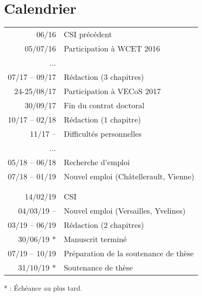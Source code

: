 \section{Calendrier}
\label{sec:timeline}

\begin{tabular}{r|l}
              06/16 \hspace{.5em} & CSI précédent
  \\       05/07/16 \hspace{.5em} & Participation à WCET 2016
  \\            ... \hspace{.5em} & 
  \\ 07/17 -- 09/17 \hspace{.5em} & Rédaction (3 chapitres)
  \\    24-25/08/17 \hspace{.5em} & Participation à VECoS 2017
  \\       30/09/17 \hspace{.5em} & Fin du contrat doctoral
  \\ 10/17 -- 02/18 \hspace{.5em} & Rédaction (1 chapitre)
  \\       11/17 -- \hspace{.5em} & Difficultés personnelles
  \\            ... \hspace{.5em} & 
  \\ 05/18 -- 06/18 \hspace{.5em} & Recherche d'emploi
  \\ 07/18 -- 01/19 \hspace{.5em} & Nouvel emploi (Châtellerault, Vienne)
  \\                              & 
  \\ \hline
  \\       14/02/19 \hspace{.5em} & CSI
  \\    04/03/19 -- \hspace{.5em} & Nouvel emploi (Versailles, Yvelines)
  \\ 03/19 -- 06/19 \hspace{.5em} & Rédaction (2 chapitres)
  \\       30/06/19 *             & Manuscrit terminé
  \\ 07/19 -- 10/19 \hspace{.5em} & Préparation de la soutenance de thèse
  \\       31/10/19 *             & Soutenance de thèse \\
\end{tabular}

\vspace{1em}
* : Échéance au plus tard.

